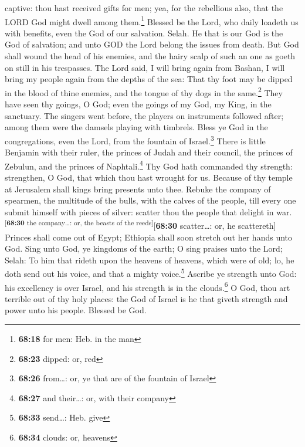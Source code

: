 captive: thou hast received gifts for men; yea, for the rebellious also,
that the LORD God might dwell among them.\footnote{\textbf{68:18} for
  men: Heb. in the man}  Blessed be the Lord, who daily
loadeth us with benefits, even the God of our salvation. Selah.
 He that is our God is the God of salvation; and unto GOD
the Lord belong the issues from death.  But God shall
wound the head of his enemies, and the hairy scalp of such an one as
goeth on still in his trespasses.  The Lord said, I will
bring again from Bashan, I will bring my people again from the depths of
the sea:  That thy foot may be dipped in the blood of
thine enemies, and the tongue of thy dogs in the same.\footnote{\textbf{68:23}
  dipped: or, red}  They have seen thy goings, O God;
even the goings of my God, my King, in the sanctuary. 
The singers went before, the players on instruments followed after;
among them were the damsels playing with timbrels.  Bless
ye God in the congregations, even the Lord, from the fountain of
Israel.\footnote{\textbf{68:26} from\ldots: or, ye that are of the
  fountain of Israel}  There is little Benjamin with
their ruler, the princes of Judah and their council, the princes of
Zebulun, and the princes of Naphtali.\footnote{\textbf{68:27} and
  their\ldots: or, with their company}  Thy God hath
commanded thy strength: strengthen, O God, that which thou hast wrought
for us.  Because of thy temple at Jerusalem shall kings
bring presents unto thee.  Rebuke the company of
spearmen, the multitude of the bulls, with the calves of the people,
till every one submit himself with pieces of silver: scatter thou the
people that delight in war.\textsuperscript{{[}\textbf{68:30} the
company\ldots: or, the beasts of the reeds{]}}{[}\textbf{68:30}
scatter\ldots: or, he scattereth{]}  Princes shall come
out of Egypt; Ethiopia shall soon stretch out her hands unto God.
 Sing unto God, ye kingdoms of the earth; O sing praises
unto the Lord; Selah:  To him that rideth upon the
heavens of heavens, which were of old; lo, he doth send out his voice,
and that a mighty voice.\footnote{\textbf{68:33} send\ldots: Heb. give}
 Ascribe ye strength unto God: his excellency is over
Israel, and his strength is in the clouds.\footnote{\textbf{68:34}
  clouds: or, heavens}  O God, thou art terrible out of
thy holy places: the God of Israel is he that giveth strength and power
unto his people. Blessed be God.

